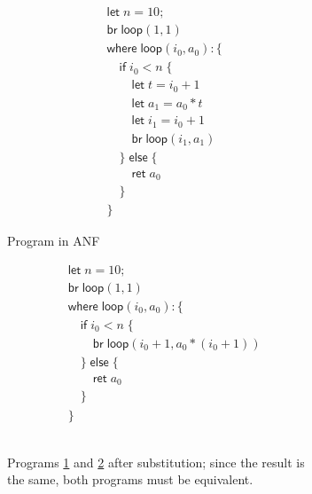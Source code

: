 \documentclass[acmsmall,screen,review]{acmart}
\newcommand{\ms}[1]{\ensuremath{\mathsf{#1}}}
\begin{document}
\begin{figure}
  \centering
  \begin{subfigure}[t]{.31\textwidth}
    \begin{align*}
      & \ms{let}\;n = 10; \\
      & \ms{br}\;\ms{loop}(1, 1) \\
      & \ms{where}\;\ms{loop}(i_0, a_0): \{\\
      & \quad \ms{if}\;i_0 < n\;\{ \\
      & \qquad \ms{let}\;t = i_0 + 1 \\
      & \qquad \ms{let}\;a_1 = a_0 * t \\
      & \qquad \ms{let}\;i_1 = i_0 + 1 \\
      & \qquad \ms{br}\;\ms{loop}(i_1, a_1) \\
      & \quad \}\;\ms{else}\;\{ \\
      & \qquad \ms{ret}\;a_0 \\
      & \quad \} \\
      & \}
    \end{align*}
    \caption{Program in ANF}
    \label{fig:fact-anf}
  \end{subfigure}%
  \begin{subfigure}[t]{.35\textwidth}
    \begin{align*}
      & \ms{let}\;n = 10; \\
      & \ms{br}\;\ms{loop}(1, 1) \\
      & \ms{where}\;\ms{loop}(i_0, a_0): \{\\
      & \quad \ms{if}\;i_0 < n\;\{ \\
      & \qquad \ms{br}\;\ms{loop}(i_0 + 1, a_0 * (i_0 + 1)) \\
      & \quad \}\;\ms{else}\;\{ \\
      & \qquad \ms{ret}\;a_0 \\
      & \quad \} \\
      & \}  \\ \\ \\
    \end{align*}
    \caption{
      Programs \ref{fig:fact-anf} and \ref{fig:fact-subst} after substitution;
      since the result is the same, both programs must be equivalent.
    }
    \label{fig:fact-subst}
  \end{subfigure}\hspace{1em}%
  \begin{subfigure}[t]{.31\textwidth}
    \begin{align*}

\end{align*}
\end{subfigure}
\end{figure}
\end{document}
